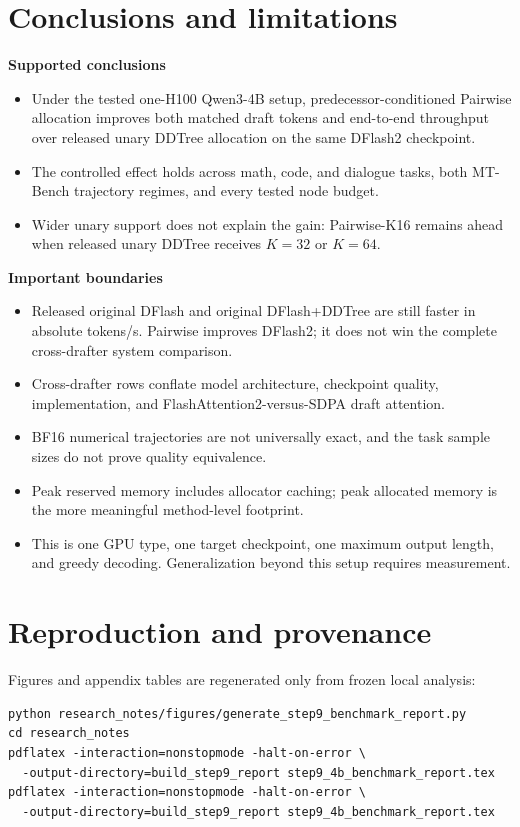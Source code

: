 \documentclass[10pt]{article}
\begin{document}
\clearpage
\section{Conclusions and limitations}

\textbf{Supported conclusions}
\begin{itemize}
\item Under the tested one-H100 Qwen3-4B setup, predecessor-conditioned
Pairwise allocation improves both matched draft tokens and end-to-end
throughput over released unary DDTree allocation on the same DFlash2
checkpoint.
\item The controlled effect holds across math, code, and dialogue tasks,
both MT-Bench trajectory regimes, and every tested node budget.
\item Wider unary support does not explain the gain: Pairwise-K16 remains
ahead when released unary DDTree receives \(K=32\) or \(K=64\).
\end{itemize}

\textbf{Important boundaries}
\begin{itemize}
\item Released original DFlash and original DFlash+DDTree are still faster
in absolute tokens/s. Pairwise improves DFlash2; it does not win the complete
cross-drafter system comparison.
\item Cross-drafter rows conflate model architecture, checkpoint quality,
implementation, and FlashAttention2-versus-SDPA draft attention.
\item BF16 numerical trajectories are not universally exact, and the task
sample sizes do not prove quality equivalence.
\item Peak reserved memory includes allocator caching; peak allocated memory
is the more meaningful method-level footprint.
\item This is one GPU type, one target checkpoint, one maximum output length,
and greedy decoding. Generalization beyond this setup requires measurement.
\end{itemize}

\section{Reproduction and provenance}

Figures and appendix tables are regenerated only from frozen local analysis:
\begin{verbatim}
python research_notes/figures/generate_step9_benchmark_report.py
cd research_notes
pdflatex -interaction=nonstopmode -halt-on-error \
  -output-directory=build_step9_report step9_4b_benchmark_report.tex
pdflatex -interaction=nonstopmode -halt-on-error \
  -output-directory=build_step9_report step9_4b_benchmark_report.tex
\end{verbatim}
\end{document}
